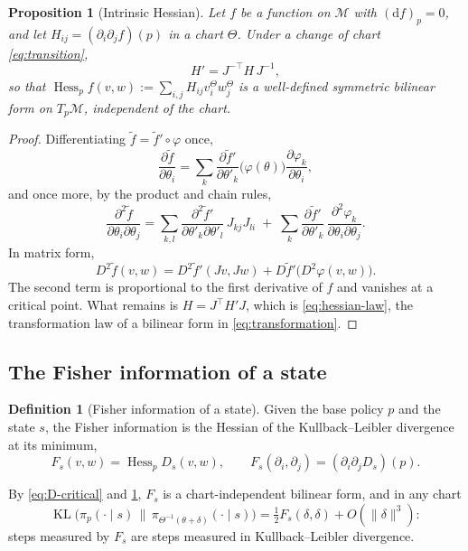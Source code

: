 \documentclass[11pt,a4paper]{article}
\numberwithin{equation}{section}
\theoremstyle{plain}
\newtheorem{proposition}[theorem]{Proposition}
\theoremstyle{definition}
\newtheorem{definition}[theorem]{Definition}
\theoremstyle{remark}
\newcommand{\T}{^{\top}}
\newcommand{\dd}{\mathrm{d}}
\DeclareMathOperator{\KL}{KL}
\DeclareMathOperator{\Hess}{Hess}
\newcommand{\mani}{\mathcal{M}}
\begin{document}
\begin{proposition}[Intrinsic Hessian]\label{prop:hessian}
Let $f$ be a function on $\mani$ with $(\dd f)_p=0$, and let $H_{ij}=(\partial_i\partial_jf)(p)$ in a chart $\Theta$. Under a change of chart \eqref{eq:transition},
\begin{equation}\label{eq:hessian-law}
  H'=J^{-\top}H\,J^{-1},
\end{equation}
so that $\Hess_pf(v,w):=\sum_{i,j}H_{ij}v^\Theta_iw^\Theta_j$ is a well-defined symmetric bilinear form on $T_p\mani$, independent of the chart.
\end{proposition}

\begin{proof}
Differentiating $\tilde f=\tilde f'\circ\varphi$ once,
\[
  \frac{\partial\tilde f}{\partial\theta_i}=\sum_k\frac{\partial\tilde f'}{\partial\theta'_k}\bigl(\varphi(\theta)\bigr)\frac{\partial\varphi_k}{\partial\theta_i},
\]
and once more, by the product and chain rules,
\[
  \frac{\partial^2\tilde f}{\partial\theta_i\partial\theta_j}
  =\sum_{k,l}\frac{\partial^2\tilde f'}{\partial\theta'_k\partial\theta'_l}\,J_{kj}J_{li}\;+\;\sum_k\frac{\partial\tilde f'}{\partial\theta'_k}\,\frac{\partial^2\varphi_k}{\partial\theta_i\partial\theta_j}.
\]
In matrix form,
\begin{equation}\label{eq:hessian-chain}
  D^2\tilde f(v,w)=D^2\tilde f'(Jv,Jw)+D\tilde f'\bigl(D^2\varphi(v,w)\bigr).
\end{equation}
The second term is proportional to the first derivative of $f$ and vanishes at a critical point. What remains is $H=J\T H'J$, which is \eqref{eq:hessian-law}, the
transformation law of a bilinear form in \eqref{eq:transformation}.
\end{proof}


\subsection{The Fisher information of a state}

\begin{definition}[Fisher information of a state]\label{def:fisher-state}
Given the base policy $p$ and the state $s$, the Fisher information is the Hessian of the Kullback--Leibler divergence at its minimum,
\[
  F_s(v,w)=\Hess_pD_s(v,w),\qquad F_s(\partial_i,\partial_j)=(\partial_i\partial_jD_s)(p).
\]
\end{definition}

By \eqref{eq:D-critical} and \cref{prop:hessian}, $F_s$ is a chart-independent bilinear form, and in any chart
\begin{equation}\label{eq:kl-quadratic}
  \KL\bigl(\pi_p(\cdot\mid s)\,\big\|\,\pi_{\Theta^{-1}(\theta+\delta)}(\cdot\mid s)\bigr)=\tfrac12F_s(\delta,\delta)+O(\|\delta\|^3):
\end{equation}
steps measured by $F_s$ are steps measured in Kullback--Leibler divergence.
\end{document}
